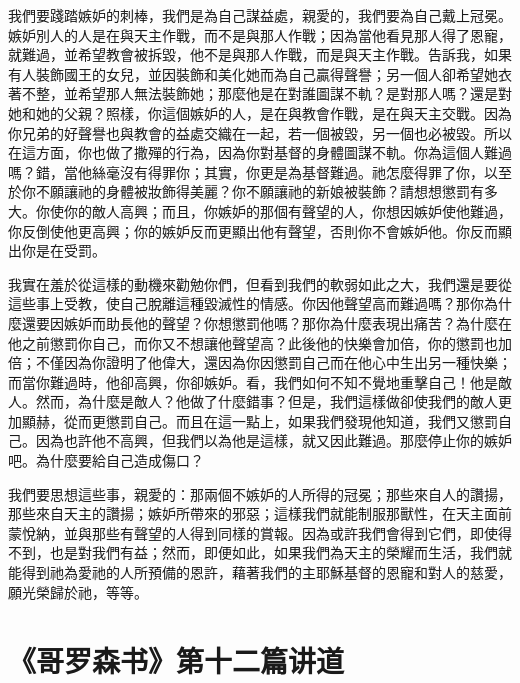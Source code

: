 我們要踐踏嫉妒的刺棒，我們是為自己謀益處，親愛的，我們要為自己戴上冠冕。嫉妒別人的人是在與天主作戰，而不是與那人作戰；因為當他看見那人得了恩寵，就難過，並希望教會被拆毀，他不是與那人作戰，而是與天主作戰。告訴我，如果有人裝飾國王的女兒，並因裝飾和美化她而為自己贏得聲譽；另一個人卻希望她衣著不整，並希望那人無法裝飾她；那麼他是在對誰圖謀不軌？是對那人嗎？還是對她和她的父親？照樣，你這個嫉妒的人，是在與教會作戰，是在與天主交戰。因為你兄弟的好聲譽也與教會的益處交織在一起，若一個被毀，另一個也必被毀。所以在這方面，你也做了撒殫的行為，因為你對基督的身體圖謀不軌。你為這個人難過嗎？錯，當他絲毫沒有得罪你；其實，你更是為基督難過。祂怎麼得罪了你，以至於你不願讓祂的身體被妝飾得美麗？你不願讓祂的新娘被裝飾？請想想懲罰有多大。你使你的敵人高興；而且，你嫉妒的那個有聲望的人，你想因嫉妒使他難過，你反倒使他更高興；你的嫉妒反而更顯出他有聲望，否則你不會嫉妒他。你反而顯出你是在受罰。\par

我實在羞於從這樣的動機來勸勉你們，但看到我們的軟弱如此之大，我們還是要從這些事上受教，使自己脫離這種毀滅性的情感。你因他聲望高而難過嗎？那你為什麼還要因嫉妒而助長他的聲望？你想懲罰他嗎？那你為什麼表現出痛苦？為什麼在他之前懲罰你自己，而你又不想讓他聲望高？此後他的快樂會加倍，你的懲罰也加倍；不僅因為你證明了他偉大，還因為你因懲罰自己而在他心中生出另一種快樂；而當你難過時，他卻高興，你卻嫉妒。看，我們如何不知不覺地重擊自己！他是敵人。然而，為什麼是敵人？他做了什麼錯事？但是，我們這樣做卻使我們的敵人更加顯赫，從而更懲罰自己。而且在這一點上，如果我們發現他知道，我們又懲罰自己。因為也許他不高興，但我們以為他是這樣，就又因此難過。那麼停止你的嫉妒吧。為什麼要給自己造成傷口？\par

我們要思想這些事，親愛的：那兩個不嫉妒的人所得的冠冕；那些來自人的讚揚，那些來自天主的讚揚；嫉妒所帶來的邪惡；這樣我們就能制服那獸性，在天主面前蒙悅納，並與那些有聲望的人得到同樣的賞報。因為或許我們會得到它們，即使得不到，也是對我們有益；然而，即便如此，如果我們為天主的榮耀而生活，我們就能得到祂為愛祂的人所預備的恩許，藉著我們的主耶穌基督的恩寵和對人的慈愛，願光榮歸於祂，等等。\par



\section{《哥罗森书》第十二篇讲道}

